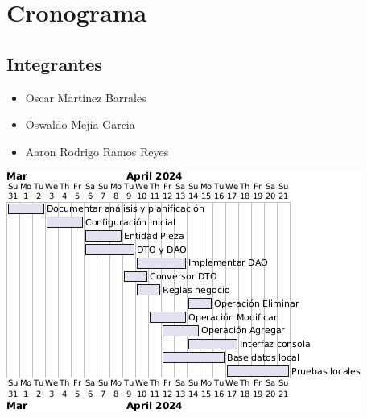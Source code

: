 \section*{\centering Cronograma}

\subsection*{Integrantes}
    \begin{itemize}
        \item Oscar Martinez Barrales
        \item Oswaldo Mejia Garcia
        \item Aaron Rodrigo Ramos Reyes
        \newline
    \end{itemize}


\includegraphics[width=.9\textwidth]{imag/DiagramaCronograma.png}

